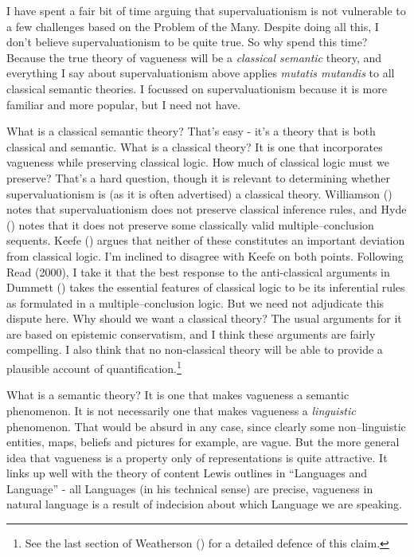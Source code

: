\documentclass[
  10pt,
  letterpaper,
  DIV=11,
  numbers=noendperiod,
  twoside]{scrartcl}
\begin{document}
I have spent a fair bit of time arguing that supervaluationism is not
vulnerable to a few challenges based on the Problem of the Many. Despite
doing all this, I don't believe supervaluationism to be quite true. So
why spend this time? Because the true theory of vagueness will be a
\emph{classical semantic} theory, and everything I say about
supervaluationism above applies \emph{mutatis mutandis} to all classical
semantic theories. I focussed on supervaluationism because it is more
familiar and more popular, but I need not have.

What is a classical semantic theory? That's easy - it's a theory that is
both classical and semantic. What is a classical theory? It is one that
incorporates vagueness while preserving classical logic. How much of
classical logic must we preserve? That's a hard question, though it is
relevant to determining whether supervaluationism is (as it is often
advertised) a classical theory. Williamson
() notes that supervaluationism
does not preserve classical inference rules, and Hyde
() notes that it does not preserve some
classically valid multiple--conclusion sequents. Keefe
() argues that neither of these
constitutes an important deviation from classical logic. I'm inclined to
disagree with Keefe on both points. Following Read (2000), I take it
that the best response to the anti-classical arguments in Dummett
() takes the essential features of
classical logic to be its inferential rules as formulated in a
multiple--conclusion logic. But we need not adjudicate this dispute
here. Why should we want a classical theory? The usual arguments for it
are based on epistemic conservatism, and I think these arguments are
fairly compelling. I also think that no non-classical theory will be
able to provide a plausible account of quantification.\footnote{See the
  last section of Weatherson
  () for a detailed defence of
  this claim.}

What is a semantic theory? It is one that makes vagueness a semantic
phenomenon. It is not necessarily one that makes vagueness a
\emph{linguistic} phenomenon. That would be absurd in any case, since
clearly some non--linguistic entities, maps, beliefs and pictures for
example, are vague. But the more general idea that vagueness is a
property only of representations is quite attractive. It links up well
with the theory of content Lewis outlines in ``Languages and Language''
- all Languages (in his technical sense) are precise, vagueness in
natural language is a result of indecision about which Language we are
speaking.
\end{document}
